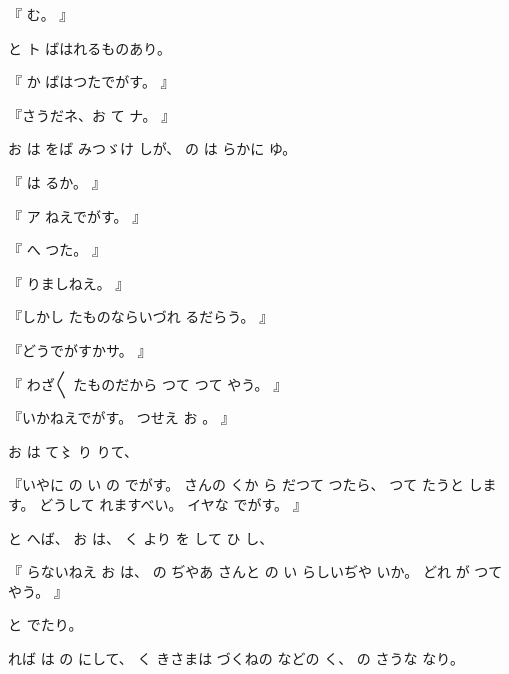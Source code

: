 『
む。
』

と
ト
ばはれるものあり。

『
か
ばはつたでがす。
』

『さうだネ、お
て
ナ。
』

お
は
をば
みつゞけ
しが、
の
は
らかに
ゆ。

『
は
るか。
』

『
ア
ねえでがす。
』

『
へ
つた。
』

『
りましねえ。
』

『しかし
たものならいづれ
るだらう。
』

『どうでがすかサ。
』

『
わざ〳〵
たものだから
つて
つて
やう。
』

『いかねえでがす。
つせえ
お
。
』

お
は
て〻
り
りて、

『いやに
の
い
の
でがす。
さんの
くか
ら
だつて
つたら、
つて
たうと
します。
どうして
れますべい。
イヤな
でがす。
』

と
へば、
お
は、
く
より
を
して
ひ
し、

『
らないねえ
お
は、
の
ぢやあ
さんと
の
い
らしいぢや
いか。
どれ
が
つて
やう。
』

と
でたり。

れば
は
の
にして、
く
きさまは
づくねの
などの
く、
の
さうな
なり。


